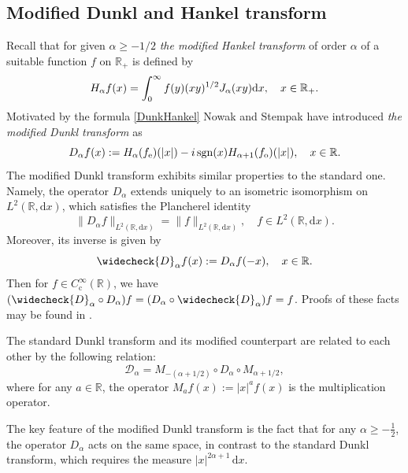 \documentclass[11pt,oneside]{amsart}
\numberwithin{equation}{section}
\theoremstyle{definition}
\newcommand{\RR}{\mathbb{R}}
\newcommand{\sgn}{\operatorname{sgn}}
\begin{document}
\subsection{Modified Dunkl and Hankel transform}
Recall that for given $\alpha\geq-1/2$ \textit{the modified Hankel transform} of order $\alpha$ of a suitable function $f$ on $\RR_+$ is defined by
\begin{equation}\label{modHankel}
	H_\alpha f(x)=\int_0^\infty{f(y)(xy)^{1/2}J_\alpha(xy){\rm d}x}, \quad x\in\RR_+.
\end{equation}
Motivated by the formula \eqref{DunkHankel} Nowak and Stempak \cite{NowakStempak} have introduced \textit{the modified Dunkl transform} as
\begin{equation}\label{modedunkl}
	    D_\alpha f(x):=H_\alpha(f_{\rm e})(|x|)-i\sgn(x) H_{\alpha+1}(f_{\rm o})(|x|),\quad x\in\RR.
\end{equation}
The modified Dunkl transform exhibits similar properties to the standard one. Namely, the operator $D_\alpha$ extends uniquely to an isometric isomorphism on $L^2(\mathbb{R}, \mathrm{d}x)$, which satisfies the Plancherel identity
\begin{equation*}
    \|D_\alpha f\|_{L^2(\mathbb{R}, \mathrm{d}x)} = \|f\|_{L^2(\mathbb{R}, \mathrm{d}x)}, \quad f \in L^2(\mathbb{R}, \mathrm{d}x).
\end{equation*}
Moreover, its inverse is given by
\begin{equation*}
    \widecheck{D}_\alpha f(x) := D_\alpha f(-x), \quad x \in \mathbb{R}.
\end{equation*}
Then for $f \in C_{\mathrm{c}}^\infty(\mathbb{R})$, we have $(\widecheck{D}_\alpha \circ D_\alpha) f = (D_\alpha \circ \widecheck{D}_\alpha) f = f$. Proofs of these facts may be found in \cite[Proposition 1.3]{NowakStempak}.

The standard Dunkl transform and its modified counterpart are related to each other by the following relation:
\begin{equation}\label{dunksrelation}
    \mathcal{D}_\alpha = M_{-(\alpha+1/2)} \circ D_\alpha \circ M_{\alpha+1/2},
\end{equation}
where for any $a \in \mathbb{R}$, the operator $M_a f(x) := |x|^a f(x)$ is the multiplication operator.


The key feature of the modified Dunkl transform is the fact that for any $\alpha \geq -\frac{1}{2}$, the operator $D_\alpha$ acts on the same space, in contrast to the standard Dunkl transform, which requires the measure $|x|^{2\alpha+1} \, \mathrm{d}x$.
\end{document}
